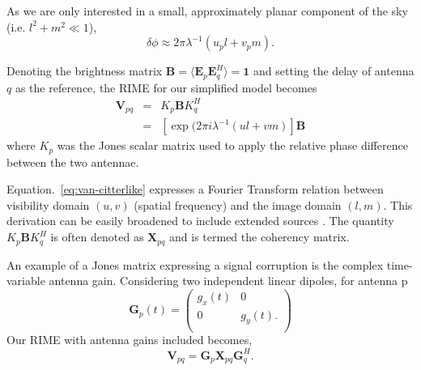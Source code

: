 
As we are only interested in a small, approximately planar component of the sky (i.e. $l^2 +m^2 \ll 1$),
\begin{equation}
 \delta \phi \approx 2\pi \lambda^{-1} (u_pl +v_pm).
\end{equation}

Denoting the brightness matrix $\bm{B} = \langle {\bm E}_p  {\bm E}_q^H \rangle = \bm{1} $ and setting the delay of antenna $q$ as the reference, the RIME for our simplified model becomes
\begin{eqnarray}\label{eq:van-citterlike}
\bm{V}_{pq} &=& K_p \bm{B} K_q^H \\
&=&  \left[\exp (2\pi i \lambda^{-1} (ul +vm)\right] \bm{B} 
\end{eqnarray}
where $K_{p}$ was the Jones scalar matrix used to apply the relative phase difference between the two antennae.


Equation.~\ref{eq:van-citterlike} expresses a Fourier Transform relation between visibility domain $(u,v)$ (spatial frequency) and the image domain $(l,m)$. This derivation can be easily broadened to include extended sources \citep[e.g.][]{Smirnov_2011a}. The quantity  $K_p \bm{B} K_q^H$ is often denoted as $\bm{X}_{pq}$ and is termed the coherency matrix.


An example of a Jones matrix expressing a signal corruption is the complex time-variable antenna gain. Considering two independent linear dipoles,  for antenna p
\begin{equation}\label{eq:G_jones}
\bm{G}_p(t) =
\left(
\begin{array}{cc}
g_x (t)&0\\
0 & g_y (t). \\
\end{array}
\right)
\end{equation}
Our RIME with antenna gains included becomes,
\begin{equation}\label{eq:G_rime}
\bm{V}_{pq} = \bm G_p \bm{X}_{pq} \bm G_q^H.
\end{equation}

